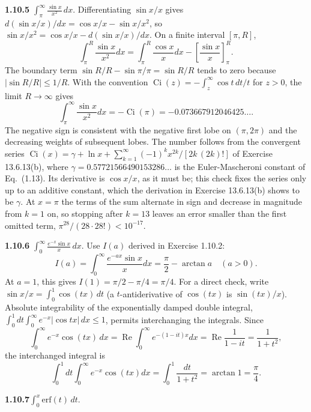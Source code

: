 \par\bigskip
\noindent\textbf{1.10.5}\quad
$\displaystyle\int_{\pi}^{\infty}\frac{\sin x}{x^{2}}\,dx$.
\solution
Differentiating $\sin x/x$ gives
$d(\sin x/x)/dx=\cos x/x-\sin x/x^2$, so
$\sin x/x^2=\cos x/x-d(\sin x/x)/dx$. On a finite interval $[\pi,R]$,
\[
 \int_\pi^R\frac{\sin x}{x^2}dx
 =\int_\pi^R\frac{\cos x}{x}dx-\left[\frac{\sin x}{x}\right]_\pi^R.
\]
The boundary term $\sin R/R-\sin\pi/\pi=\sin R/R$ tends to zero
because $|\sin R/R|\le1/R$. With the convention
$\operatorname{Ci}(z)=-\int_z^\infty\cos t\,dt/t$ for $z>0$, the limit
$R\to\infty$ gives
\[
 \boxed{\int_\pi^\infty\frac{\sin x}{x^2}dx
 =-\operatorname{Ci}(\pi)=-0.073667912046425\ldots}.
\]
The negative sign is consistent with the negative first lobe on
$(\pi,2\pi)$ and the decreasing weights of subsequent lobes.
The number follows from the convergent series
$\operatorname{Ci}(x)=\gamma+\ln x+\sum_{k=1}^\infty(-1)^kx^{2k}/[2k\,(2k)!]$
of Exercise 13.6.13(b), where $\gamma=0.57721566490153286\ldots$ is the
Euler-Mascheroni constant of Eq.~(1.13). Its derivative is $\cos x/x$,
as it must be; this check fixes the series only up to an additive
constant, which the derivation in Exercise 13.6.13(b) shows to be
$\gamma$. At $x=\pi$ the terms of the sum alternate
in sign and decrease in magnitude from $k=1$ on, so stopping after
$k=13$ leaves an error smaller than the first omitted term,
$\pi^{28}/(28\cdot28!)<10^{-17}$.


\par\bigskip
\noindent\textbf{1.10.6}\quad
$\displaystyle\int_{0}^{\infty}\frac{e^{-x}\sin x}{x}\,dx$.
\solution
Use $I(a)$ derived in Exercise 1.10.2:
\[
 I(a)=\int_0^\infty\frac{e^{-ax}\sin x}{x}dx
     =\frac\pi2-\arctan a\quad(a>0).
\]
At $a=1$, this gives $\boxed{I(1)=\pi/2-\pi/4=\pi/4}$.
For a direct check, write $\sin x/x=\int_0^1\cos(tx)\,dt$ (a
$t$-antiderivative of $\cos(tx)$ is $\sin(tx)/x$). Absolute
integrability of the exponentially damped double integral,
$\int_0^1dt\int_0^\infty e^{-x}|\cos tx|\,dx\le1$, permits
interchanging the integrals. Since
\[
 \int_0^\infty e^{-x}\cos(tx)\,dx=\operatorname{Re}\int_0^\infty
 e^{-(1-it)x}dx=\operatorname{Re}\frac1{1-it}=\frac1{1+t^2},
\]
the interchanged integral is
\[
 \int_0^1dt\int_0^\infty e^{-x}\cos(tx)dx
 =\int_0^1\frac{dt}{1+t^2}=\arctan1=\frac\pi4.
\]


\par\bigskip
\noindent\textbf{1.10.7}\quad $\displaystyle\int_{0}^{x}\mathrm{erf}(t)\,dt$.

